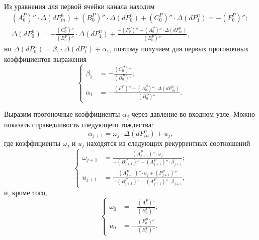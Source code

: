 Из уравнения для первой ячейки канала находим
\begin{eqnarray}
\label{formula612}
\left(A_0^P \right)'' \cdot \Delta(dP_{in}^n) + \left(B_0^P \right)'' \cdot \Delta(dP_0^n) + \left(C_0^P \right)'' \cdot \Delta(dP_1^n) = -\left(F_0^P \right)''; \nonumber ~\\
\Delta(dP_0^n)=-\frac{\left(C_0^P \right)''}{\left(B_0^P \right)''} \cdot \Delta(dP_1^n) + \frac{-\left(F_0^P \right)'' - \left(A_0^P \right)'' \cdot \Delta(dP_{in}^n)}{\left(B_0^P \right)''}, 
\end{eqnarray}
но $\Delta(dP_0^n)=\beta_1 \cdot \Delta(dP_1^n) + \alpha_1$, поэтому получаем для первых прогоночных коэффициентов выражения
\begin{equation}
\label{formula613}
\left\{
\begin{aligned}
\beta_1 & =  -\frac{\left(C_0^P \right)''}{\left(B_0^P \right)''}; \\
\alpha_1 & = -\frac{\left(F_0^P \right)'' + \left(A_0^P \right)'' \cdot \Delta(dP_{in}^n)}{\left(B_0^P \right)''}.
\end{aligned}
\right.
\end{equation}

Выразим прогоночные коэффициенты $\alpha_j$ через давление во входном узле. Можно показать справедливость следующего тождества:
\begin{equation}
\label{formula614}
\alpha_{j+1}=\omega_j \cdot \Delta(dP_{in}^n) + u_j,
\end{equation}
где коэффициенты $\omega_j$ и $u_j$ находятся из следующих рекуррентных соотношений
\begin{equation}
\label{formula615}
\left\{
\begin{aligned}
\omega_{j+1} & = \frac{\left(A_{j+1}^P \right)'' \cdot \omega_j}{-\left(B_{j+1}^P \right)'' - \left(A_{j+1}^P \right)'' \cdot \beta_{j+1}}; \\
u_{j+1} & = \frac{\left(A_{j+1}^P \right)'' \cdot u_j + \left(F_{j+1}^P \right)'' }{-\left(B_{j+1}^P \right)'' - \left(A_{j+1}^P \right)'' \cdot \beta_{j+1}}, 
\end{aligned}
\right.
\end{equation}
и, кроме того,
\begin{equation}
\label{formula616}
\left\{
\begin{aligned}
\omega_0 & = -\frac{\left(A_0^P \right)''}{\left(B_0^P \right)''}; \\
u_0 & = -\frac{\left(F_0^P \right)''}{\left(B_0^P \right)''}. 
\end{aligned}
\right.
\end{equation}


